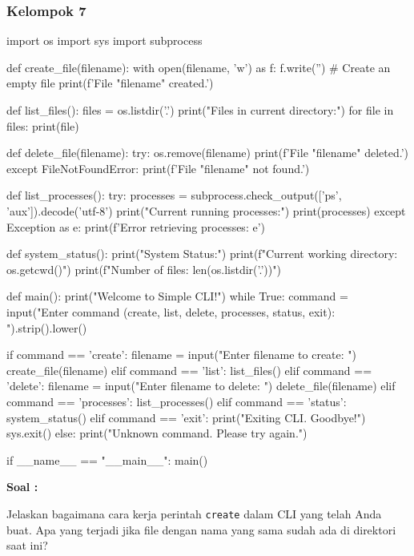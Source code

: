 \documentclass[12pt]{article}
\begin{document}
\subsubsection{Kelompok 7}

\begin{python}
import os
import sys
import subprocess

def create_file(filename):
    with open(filename, 'w') as f:
        f.write('')  # Create an empty file
    print(f'File "{filename}" created.')

def list_files():
    files = os.listdir('.')
    print("Files in current directory:")
    for file in files:
        print(file)

def delete_file(filename):
    try:
        os.remove(filename)
        print(f'File "{filename}" deleted.')
    except FileNotFoundError:
        print(f'File "{filename}" not found.')

def list_processes():
    try:
        processes = subprocess.check_output(['ps', 'aux']).decode('utf-8')
        print("Current running processes:")
        print(processes)
    except Exception as e:
        print(f'Error retrieving processes: {e}')

def system_status():
    print("System Status:")
    print(f"Current working directory: {os.getcwd()}")
    print(f"Number of files: {len(os.listdir('.'))}")

def main():
    print("Welcome to Simple CLI!")
    while True:
        command = input("Enter command (create, list, delete, processes, status, exit): ").strip().lower()
        
        if command == 'create':
            filename = input("Enter filename to create: ")
            create_file(filename)
        elif command == 'list':
            list_files()
        elif command == 'delete':
            filename = input("Enter filename to delete: ")
            delete_file(filename)
        elif command == 'processes':
            list_processes()
        elif command == 'status':
            system_status()
        elif command == 'exit':
            print("Exiting CLI. Goodbye!")
            sys.exit()
        else:
            print("Unknown command. Please try again.")

if __name__ == "__main__":
    main()
\end{python}

\textbf{Soal : }

Jelaskan bagaimana cara kerja perintah \texttt{create} dalam CLI yang telah Anda buat. Apa yang terjadi jika file dengan nama yang sama sudah ada di direktori saat ini?
\end{document}
